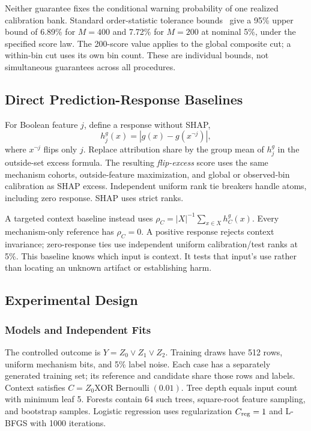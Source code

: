 \documentclass[conference]{IEEEtran}
\begin{document}
Neither guarantee fixes the conditional warning probability of one realized calibration bank. Standard order-statistic tolerance bounds~\cite{vovk2012conditional} give a 95\% upper bound of 6.89\% for $M=400$ and 7.72\% for $M=200$ at nominal 5\%, under the specified score law. The 200-score value applies to the global composite cut; a within-bin cut uses its own bin count. These are individual bounds, not simultaneous guarantees across all procedures.

\subsection{Direct Prediction-Response Baselines}
For Boolean feature $j$, define a response without SHAP,
\begin{equation}
 h_j^g(x)=|g(x)-g(x^{\lnot j})|,
\end{equation}
where $x^{\lnot j}$ flips only $j$. Replace attribution share by the group mean of $h_j^g$ in the outside-set excess formula. The resulting \emph{flip-excess} score uses the same mechanism cohorts, outside-feature maximization, and global or observed-bin calibration as SHAP excess. Independent uniform rank tie breakers handle atoms, including zero response. SHAP uses strict ranks.

A targeted context baseline instead uses $\rho_C=|X|^{-1}\sum_{x\in X}h_C^g(x)$. Every mechanism-only reference has $\rho_C=0$. A positive response rejects context invariance; zero-response ties use independent uniform calibration/test ranks at 5\%. This baseline knows which input is context. It tests that input's use rather than locating an unknown artifact or establishing harm.

\subsection{Experimental Design}
\subsubsection{Models and Independent Fits}
The controlled outcome is $Y=Z_0\lor Z_1\lor Z_2$. Training draws have 512 rows, uniform mechanism bits, and 5\% label noise. Each case has a separately generated training set; its reference and candidate share those rows and labels. Context satisfies $C=Z_0\mathbin{\mathrm{XOR}}\operatorname{Bernoulli}(0.01)$. Tree depth equals input count with minimum leaf 5. Forests contain 64 such trees, square-root feature sampling, and bootstrap samples. Logistic regression uses regularization $C_{\rm reg}=1$ and L-BFGS with 1000 iterations.
\end{document}

